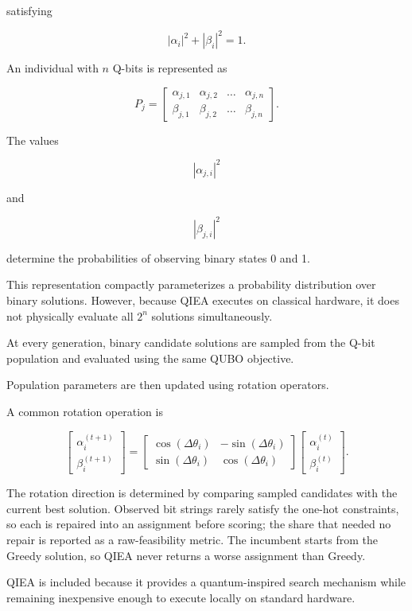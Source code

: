 \documentclass[12pt, a4paper]{article}
\begin{document}
satisfying

$$
|\alpha_i|^2+|\beta_i|^2=1.
$$

An individual with $n$ Q-bits is represented as

$$
P_j
=
\begin{bmatrix}
\alpha_{j,1} &
\alpha_{j,2} &
\dots &
\alpha_{j,n}\\
\beta_{j,1} &
\beta_{j,2} &
\dots &
\beta_{j,n}
\end{bmatrix}.
$$

The values

$$
|\alpha_{j,i}|^2
$$

and

$$
|\beta_{j,i}|^2
$$

determine the probabilities of observing binary states 0 and 1.

This representation compactly parameterizes a probability distribution over binary solutions. However, because QIEA executes on classical hardware, it does not physically evaluate all $2^n$ solutions simultaneously.

At every generation, binary candidate solutions are sampled from the Q-bit population and evaluated using the same QUBO objective.

Population parameters are then updated using rotation operators.

A common rotation operation is

$$
\begin{bmatrix}
\alpha_i^{(t+1)}\\
\beta_i^{(t+1)}
\end{bmatrix}
=
\begin{bmatrix}
\cos(\Delta\theta_i) &
-\sin(\Delta\theta_i)\\
\sin(\Delta\theta_i) &
\cos(\Delta\theta_i)
\end{bmatrix}
\begin{bmatrix}
\alpha_i^{(t)}\\
\beta_i^{(t)}
\end{bmatrix}.
$$

The rotation direction is determined by comparing sampled candidates with the current best solution. Observed bit strings rarely satisfy the one-hot constraints, so each is repaired into an assignment before scoring; the share that needed no repair is reported as a raw-feasibility metric. The incumbent starts from the Greedy solution, so QIEA never returns a worse assignment than Greedy.

QIEA is included because it provides a quantum-inspired search mechanism while remaining inexpensive enough to execute locally on standard hardware.
\end{document}
